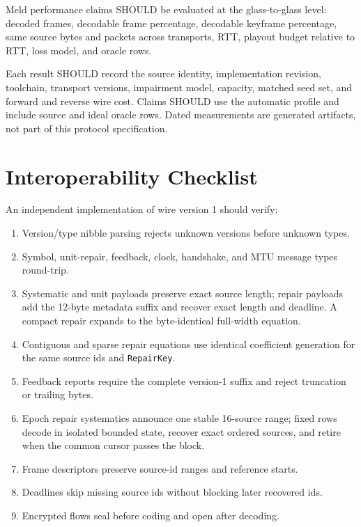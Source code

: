 \documentclass[11pt]{article}
\newcommand{\wireversion}{1}
\newcommand{\code}[1]{\ifmmode\text{\texttt{#1}}\else\texttt{#1}\fi}
\newcommand{\field}[1]{\code{#1}}
\begin{document}
Meld performance claims SHOULD be evaluated at the glass-to-glass level:
decoded frames, decodable frame percentage, decodable keyframe percentage, same
source bytes and packets across transports, RTT, playout budget relative to RTT,
loss model, and oracle rows.

Each result SHOULD record the source identity, implementation revision,
toolchain, transport versions, impairment model, capacity, matched seed set,
and forward and reverse wire cost.  Claims SHOULD use the automatic profile and
include source and ideal oracle rows.  Dated measurements are generated
artifacts, not part of this protocol specification.

\section{Interoperability Checklist}
\label{sec:interop}

An independent implementation of wire version \wireversion{} should verify:

\begin{enumerate}
\item Version/type nibble parsing rejects unknown versions before unknown types.
\item Symbol, unit-repair, feedback, clock, handshake, and MTU message types round-trip.
\item Systematic and unit payloads preserve exact source length; repair payloads
      add the 12-byte metadata suffix and recover exact length and deadline.
      A compact repair expands to the byte-identical full-width equation.
\item Contiguous and sparse repair equations use identical coefficient generation
      for the same source ids and \field{RepairKey}.
\item Feedback reports require the complete version-1 suffix and reject
      truncation or trailing bytes.
\item Epoch repair systematics announce one stable 16-source range; fixed
      rows decode in isolated bounded state, recover exact ordered sources, and
      retire when the common cursor passes the block.
\item Frame descriptors preserve source-id ranges and reference starts.
\item Deadlines skip missing source ids without blocking later recovered ids.
\item Encrypted flows seal before coding and open after decoding.
\end{enumerate}
\end{document}
